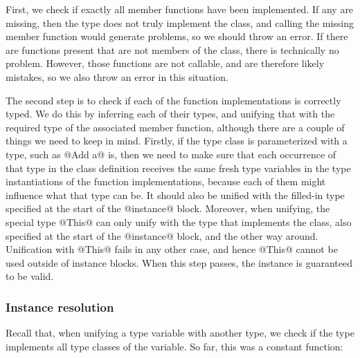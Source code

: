 First, we check if exactly all member functions have been implemented. If any are missing, then the type does not truly implement the class, and calling the missing member function would generate problems, so we should throw an error. If there are functions present that are not members of the class, there is technically no problem. However, those functions are not callable, and are therefore likely mistakes, so we also throw an error in this situation.

The second step is to check if each of the function implementations is correctly typed. We do this by inferring each of their types, and unifying that with the required type of the associated member function, although there are a couple of things we need to keep in mind. Firstly, if the type class is parameterized with a type, such as @Add a@ is, then we need to make sure that each occurrence of that type in the class definition receives the same fresh type variables in the type instantiations of the function implementations, because each of them might influence what that type can be. It should also be unified with the filled-in type specified at the start of the @instance@ block. Moreover, when unifying, the special type @This@ can only unify with the type that implements the class, also specified at the start of the @instance@ block, and the other way around. Unification with @This@ fails in any other case, and hence @This@ cannot be used outside of instance blocks. When this step passes, the instance is guaranteed to be valid.


\subsubsection{Instance resolution}\label{solution:instance_resolution}
Recall that, when unifying a type variable with another type, we check if the type implements all type classes of the variable. So far, this was a constant function:

